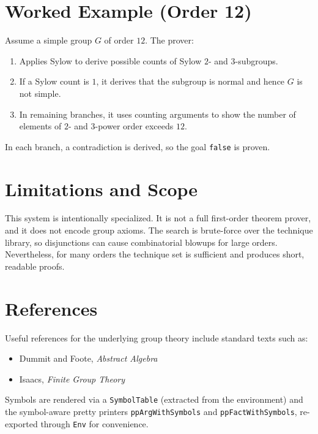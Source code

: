 \documentclass[11pt,oneside]{article}
\begin{document}
\section{Worked Example (Order 12)}
Assume a simple group $G$ of order $12$. The prover:
\begin{enumerate}
\item Applies Sylow to derive possible counts of Sylow $2$- and
  $3$-subgroups.
\item If a Sylow count is $1$, it derives that the subgroup is normal
  and hence $G$ is not simple.
\item In remaining branches, it uses counting arguments to show the
  number of elements of $2$- and $3$-power order exceeds $12$.
\end{enumerate}
In each branch, a contradiction is derived, so the goal \texttt{false}
is proven.

\section{Limitations and Scope}
This system is intentionally specialized. It is not a full first-order
theorem prover, and it does not encode group axioms. The search is
brute-force over the technique library, so disjunctions can cause
combinatorial blowups for large orders. Nevertheless, for many orders
the technique set is sufficient and produces short, readable proofs.

\section{References}
Useful references for the underlying group theory include standard
texts such as:
\begin{itemize}
\item Dummit and Foote, \textit{Abstract Algebra}
\item Isaacs, \textit{Finite Group Theory}
\end{itemize}

Symbols are rendered via a \texttt{SymbolTable} (extracted from the environment)
and the symbol-aware pretty printers \texttt{ppArgWithSymbols} and
\texttt{ppFactWithSymbols}, re-exported through \texttt{Env} for convenience.
\end{document}

